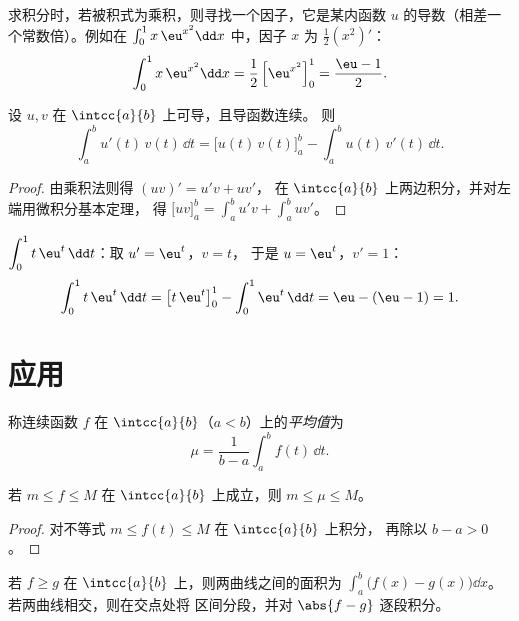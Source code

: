 \begin{method}\label{met:g12:integ:uprime}
求积分时，若被积式为乘积，则寻找一个因子，它是某内函数 
$u$ 的导数（相差一个常数倍）。例如在
$\int_0^1 x\,\eu^{x^2}\dd x$ 中，因子 $x$ 为 $\frac12 (x^2)'$：
\[
\int_0^1 x\,\eu^{x^2}\dd x = \frac12\left[\eu^{x^2}\right]_0^1
= \frac{\eu - 1}{2}.
\]
\end{method}

\begin{theorem}[分部积分法]\label{thm:g12:integ:ibp}
设 $u, v$ 在 $\intcc{a}{b}$ 上可导，且导函数连续。
则
\[
\int_a^b u'(t)\,v(t)\,\dd t
= \bigl[u(t)\,v(t)\bigr]_a^b - \int_a^b u(t)\,v'(t)\,\dd t .
\]
\end{theorem}

\begin{proof}
由乘积法则得 $(uv)' = u'v + uv'$，
在 $\intcc{a}{b}$ 上两边积分，并对左端用微积分基本定理，
得 $\bigl[uv\bigr]_a^b = \int_a^b u'v + \int_a^b uv'$。
\end{proof}

\begin{example}\label{ex:g12:integ:ibp}
$\displaystyle\int_0^1 t\,\eu^{t}\,\dd t$：取 $u' = \eu^t$，$v = t$，
于是 $u = \eu^t$，$v' = 1$：
\[
\int_0^1 t\,\eu^t\,\dd t = \bigl[t\,\eu^t\bigr]_0^1 - \int_0^1 \eu^t\,\dd t
= \eu - (\eu - 1) = 1 .
\]
\end{example}

\section{应用}

\begin{definition}[平均值]\label{def:g12:integ:mean}
称连续函数 $f$ 在
$\intcc{a}{b}$（$a<b$）上的\emph{平均值}为
\[
\mu = \frac{1}{b-a}\int_a^b f(t)\,\dd t .
\]
\end{definition}

\begin{proposition}\label{prop:g12:integ:meanbounds}
若 $m \leq f \leq M$ 在 $\intcc{a}{b}$ 上成立，则 $m \leq \mu \leq M$。
\end{proposition}

\begin{proof}
对不等式 $m \leq f(t) \leq M$ 在 $\intcc{a}{b}$ 上积分，
再除以 $b - a > 0$。
\end{proof}

\begin{method}[两条曲线之间的面积]\label{met:g12:integ:areabetween}
若 $f \geq g$ 在 $\intcc{a}{b}$ 上，则两曲线之间的面积为
$\int_a^b \bigl(f(x) - g(x)\bigr)\dd x$。若两曲线相交，则在交点处将
区间分段，并对 $\abs{f - g}$ 逐段积分。
\end{method}

